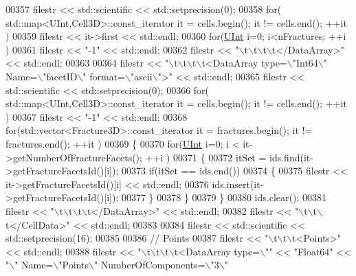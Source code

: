 \begin{DoxyCode}
00357     filestr << std::scientific << std::setprecision(0);
00358     \textcolor{keywordflow}{for}( std::map<UInt,Cell3D>::const\_iterator it = cells.begin(); it != cells.end(); ++it )
00359         filestr << it->first << std::endl;
00360     \textcolor{keywordflow}{for}(\hyperlink{namespaceFVCode3D_a4bf7e328c75d0fd504050d040ebe9eda}{UInt} i=0; i<nFractures; ++i )
00361         filestr << \textcolor{stringliteral}{"-1"} << std::endl;
00362     filestr << \textcolor{stringliteral}{"\(\backslash\)t\(\backslash\)t\(\backslash\)t\(\backslash\)t</DataArray>"} << std::endl;
00363 
00364     filestr << \textcolor{stringliteral}{"\(\backslash\)t\(\backslash\)t\(\backslash\)t\(\backslash\)t<DataArray type=\(\backslash\)"Int64\(\backslash\)" Name=\(\backslash\)"facetID\(\backslash\)" format=\(\backslash\)"ascii\(\backslash\)">"} << std::endl;
00365     filestr << std::scientific << std::setprecision(0);
00366     \textcolor{keywordflow}{for}( std::map<UInt,Cell3D>::const\_iterator it = cells.begin(); it != cells.end(); ++it )
00367         filestr << \textcolor{stringliteral}{"-1"} << std::endl;
00368     \textcolor{keywordflow}{for}(std::vector<Fracture3D>::const\_iterator it = fractures.begin(); it != fractures.end(); ++it )
00369     \{
00370         \textcolor{keywordflow}{for}(\hyperlink{namespaceFVCode3D_a4bf7e328c75d0fd504050d040ebe9eda}{UInt} i=0; i < it->getNumberOfFractureFacets(); ++i )
00371         \{
00372             itSet = ids.find(it->getFractureFacetsId()[i]);
00373             \textcolor{keywordflow}{if}(itSet == ids.end())
00374             \{
00375                 filestr << it->getFractureFacetsId()[i] << std::endl;
00376                 ids.insert(it->getFractureFacetsId()[i]);
00377             \}
00378         \}
00379     \}
00380     ids.clear();
00381     filestr << \textcolor{stringliteral}{"\(\backslash\)t\(\backslash\)t\(\backslash\)t\(\backslash\)t</DataArray>"} << std::endl;
00382     filestr << \textcolor{stringliteral}{"\(\backslash\)t\(\backslash\)t\(\backslash\)t</CellData>"} << std::endl;
00383 
00384     filestr << std::scientific << std::setprecision(16);
00385 
00386     \textcolor{comment}{// Points}
00387     filestr << \textcolor{stringliteral}{"\(\backslash\)t\(\backslash\)t\(\backslash\)t<Points>"} << std::endl;
00388     filestr << \textcolor{stringliteral}{"\(\backslash\)t\(\backslash\)t\(\backslash\)t\(\backslash\)t<DataArray type=\(\backslash\)""} << \textcolor{stringliteral}{"Float64"} << \textcolor{stringliteral}{"\(\backslash\)" Name=\(\backslash\)"Points\(\backslash\)" NumberOfComponents=\(\backslash\)"3\(\backslash\)"
}
\end{DoxyCode}
